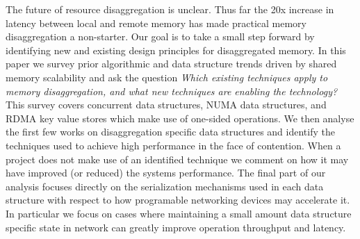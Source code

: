
The future of resource disaggregation is unclear. Thus far the 20x increase in
latency between local and remote memory has made practical memory disaggregation
a non-starter. Our goal is to take a small step forward by
identifying new and existing design principles for disaggregated memory.
In this paper we survey prior algorithmic and data structure trends driven by
shared memory scalability and ask the question \textit{Which existing techniques
apply to memory disaggregation, and what new techniques are enabling the
technology?} This survey covers concurrent data structures, NUMA data
structures, and RDMA key value stores which make use of one-sided operations.
We then analyse the first few works on disaggregation specific data structures
and identify the techniques used to achieve high performance in the face of
contention. When a project does not make use of an identified technique we
comment on how it may have improved (or reduced) the systems performance. The
final part of our analysis focuses directly on the serialization mechanisms used
in each data structure with respect to how programable networking devices may
accelerate it. In particular we focus on cases where maintaining a small amount
data structure specific state in network can greatly improve operation
throughput and latency.




